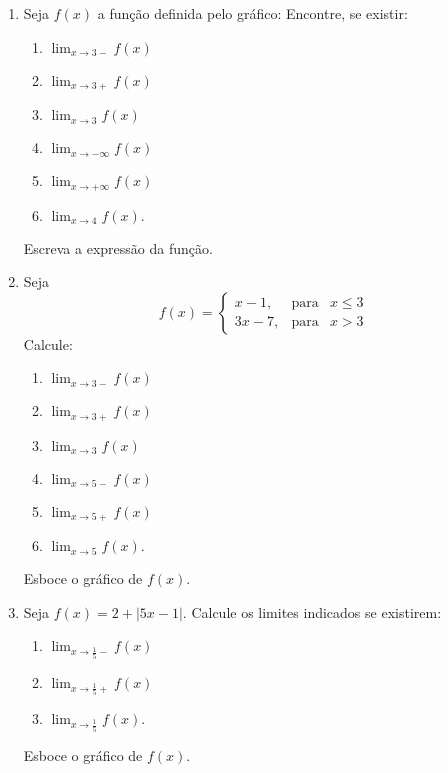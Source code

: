 \begin{enumerate}
\item Seja $f(x)$ a função definida pelo gráfico:
Encontre, se existir:
\begin{multicols}{3}
\begin{enumerate}
\item $\displaystyle\lim_{x\longrightarrow3-}f(x)$ \item
$\displaystyle\lim_{x\longrightarrow3+} f(x)$ \item
$\displaystyle\lim_{x\longrightarrow3} f(x) $ \item $
\displaystyle\lim_{x\longrightarrow-\infty} f(x)$ \item
$\displaystyle\lim_{x\longrightarrow+\infty} f(x)$ \item
$\displaystyle\lim_{x\longrightarrow4} f(x).$
\end{enumerate}
\end{multicols}
Escreva a expressão da função.


\item Seja $$f(x) = \left\{\begin{array}{rcl} x - 1,& \mbox{para}&
x \leq 3\\
 3x-7,& \mbox{para}& x
> 3 \end{array}
\right.$$ Calcule:
\begin{multicols}{3}
\begin{enumerate}
\item $\displaystyle\lim_{x\longrightarrow3-}f(x)$ \item
$\displaystyle\lim_{x\longrightarrow3+} f(x)$ \item
$\displaystyle\lim_{x\longrightarrow3} f(x) $ \item $
\displaystyle\lim_{x\longrightarrow5-} f(x)$ \item
$\displaystyle\lim_{x\longrightarrow5+} f(x)$ \item
$\displaystyle\lim_{x\longrightarrow5} f(x).$
\end{enumerate}
\end{multicols}

Esboce o gráfico de $f(x).$


\item Seja $f(x) = 2 + |5x-1|.$ Calcule os limites indicados se
existirem:
\begin{multicols}{3}
\begin{enumerate}
\item $\displaystyle\lim_{x\longrightarrow\frac{1}{ 5}-} f(x)$
\item $ \displaystyle\lim_{x\longrightarrow\frac{1}{ 5}+} f(x)$
\item $\displaystyle\lim_{x\longrightarrow\frac{1}{ 5}} f(x).$
\end{enumerate}
\end{multicols}
Esboce o gráfico de $f(x).$


\end{enumerate}

